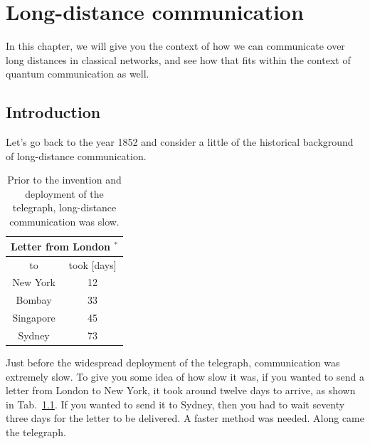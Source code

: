\chapter{Long-distance communication}
\label{sec:11_long-distance}

In this chapter, we will give you the context of how we can communicate over long distances in classical networks, and see how that fits within the context of quantum communication as well.

\section{Introduction}
\label{sec:ld-intro}


Let's go back to the year 1852 and consider a little of the historical background of long-distance communication.

\begin{table}
\centering
\begin{tabular}{|c|c|}
\hline \multicolumn{2}{|c|}{ Letter from London ${ }^*$} \\
\hline to & took [days] \\
\hline New York & 12 \\
Bombay & 33 \\
Singapore & 45 \\
Sydney & 73 \\
\hline
\end{tabular}
\caption{Prior to the invention and deployment of the telegraph, long-distance communication was slow.}
\label{tab:london-letter}
\end{table}

Just before the widespread deployment of the telegraph, communication was extremely slow. To give you some idea of how slow it was, if you wanted to send a letter from London to New York, it took around twelve days to arrive, as shown in Tab.~\ref{tab:london-letter}. If you wanted to send it to Sydney, then you had to wait seventy three days for the letter to be delivered. 
A faster method was needed. Along came the telegraph. 

